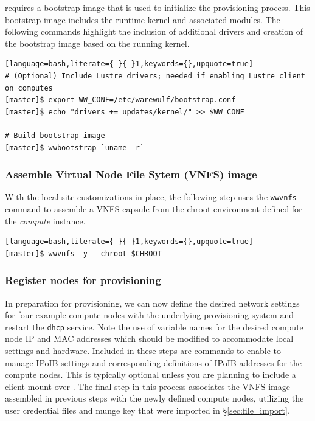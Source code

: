 \documentclass[letterpaper]{article}
\begin{document}
\Warewulf{} requires a bootstrap image that is used to initialize the provisioning
process. This bootstrap image includes the runtime kernel and associated
modules. The following commands highlight the inclusion of additional drivers
and creation of the bootstrap image based on the running kernel.

\begin{lstlisting}[language=bash,literate={-}{-}1,keywords={},upquote=true]
# (Optional) Include Lustre drivers; needed if enabling Lustre client on computes
[master]$ export WW_CONF=/etc/warewulf/bootstrap.conf
[master]$ echo "drivers += updates/kernel/" >> $WW_CONF

# Build bootstrap image
[master]$ wwbootstrap `uname -r`
\end{lstlisting}

\subsubsection{Assemble Virtual Node File Sytem (VNFS) image}

With the local site customizations in place, the following step uses the
\texttt{wwvnfs} command to assemble a VNFS capsule from the chroot environment
defined for the {\em compute} instance. 

\begin{lstlisting}[language=bash,literate={-}{-}1,keywords={},upquote=true]
[master]$ wwvnfs -y --chroot $CHROOT
\end{lstlisting}

\subsubsection{Register nodes for provisioning}

In preparation for provisioning, we can now define the desired network settings
for four example compute nodes with the underlying provisioning system and
restart the \texttt{dhcp} service. Note the use of variable names for the
desired compute node IP and MAC addresses which should be modified to
accommodate local settings and hardware. Included in these steps are commands
to enable \Warewulf{} to manage IPoIB settings and corresponding definitions of
IPoIB addresses for the compute nodes. This is typically optional unless you
are planning to include a \Lustre{} client mount over \InfiniBand{}.  The final step
in this process associates the VNFS image assembled in previous steps with the
newly defined compute nodes, utilizing the user credential files and munge key
that were imported in \S\ref{sec:file_import}.
\end{document}
